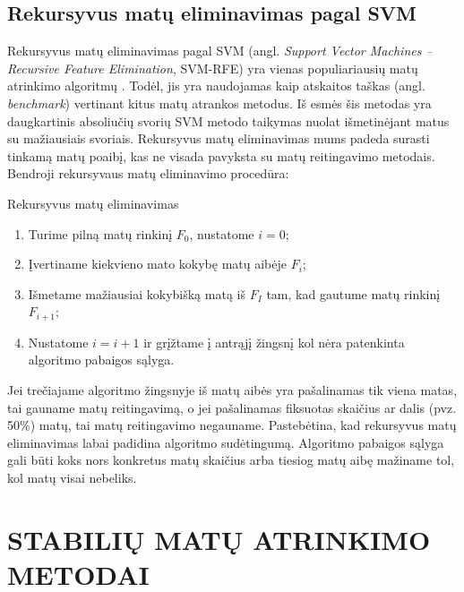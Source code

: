\subsection{Rekursyvus matų eliminavimas pagal SVM}

Rekursyvus matų eliminavimas pagal SVM (angl. \textit{Support Vector Machines -- Recursive Feature Elimination}, SVM-RFE) yra vienas populiariausių matų atrinkimo algoritmų \cite{guyon2002gene}. Todėl, jis yra naudojamas kaip atskaitos taškas (angl. \textit{benchmark}) vertinant kitus matų atrankos metodus. Iš esmės šis metodas yra daugkartinis absoliučių svorių SVM metodo taikymas nuolat išmetinėjant matus su mažiausiais svoriais. Rekursyvus matų eliminavimas mums padeda surasti tinkamą matų poaibį, kas ne visada pavyksta su matų reitingavimo metodais. Bendroji rekursyvaus matų eliminavimo procedūra:
\begin{algorithm}
\caption{Rekursyvus matų eliminavimas}
\label{RFE}
 \begin{enumerate}
 \item Turime pilną matų rinkinį $F_0$, nustatome $i=0$;
 \item Įvertiname kiekvieno mato kokybę matų aibėje $F_i$;
 \item Išmetame mažiausiai kokybišką matą iš $F_I$ tam, kad gautume matų rinkinį $F_{i+1}$;
 \item Nustatome $i=i+1$ ir grįžtame į antrąjį žingsnį kol nėra patenkinta algoritmo pabaigos sąlyga.
\end{enumerate}
\end{algorithm}
Jei trečiajame algoritmo žingsnyje iš matų aibės yra pašalinamas tik viena matas, tai gauname matų reitingavimą, o jei pašalinamas fiksuotas skaičius ar dalis (pvz. 50\%) matų, tai matų reitingavimo negauname. Pastebėtina, kad rekursyvus matų eliminavimas labai padidina algoritmo sudėtingumą. Algoritmo pabaigos sąlyga gali būti koks nors konkretus matų skaičius arba tiesiog matų aibę mažiname tol, kol matų visai nebeliks.

\section{STABILIŲ MATŲ ATRINKIMO METODAI}
\label{stabiliu_matu_atrinkimo_metodai}

